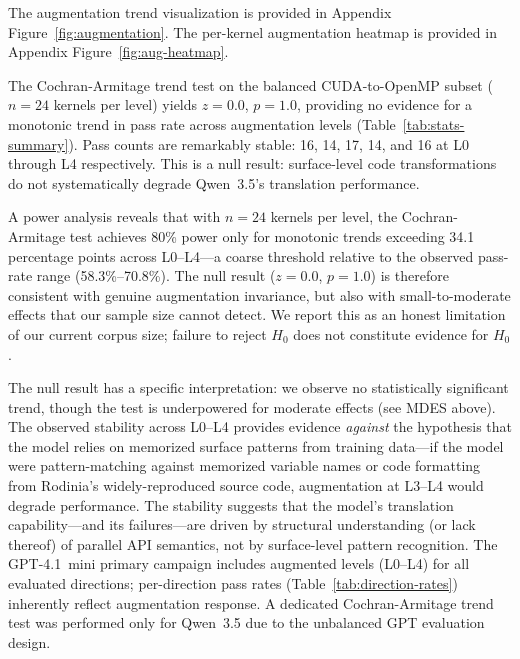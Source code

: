 \documentclass[conference]{IEEEtran}
\begin{document}
The augmentation trend visualization is provided in Appendix Figure~\ref{fig:augmentation}.
The per-kernel augmentation heatmap is provided in Appendix Figure~\ref{fig:aug-heatmap}.


The Cochran-Armitage trend test on the balanced CUDA-to-OpenMP subset ($n=24$ kernels per level) yields $z = 0.0$, $p = 1.0$, providing no evidence for a monotonic trend in pass rate across augmentation levels (Table~\ref{tab:stats-summary}). Pass counts are remarkably stable: 16, 14, 17, 14, and 16 at L0 through L4 respectively. This is a null result: surface-level code transformations do not systematically degrade Qwen~3.5's translation performance.

A power analysis reveals that with $n=24$ kernels per level,
the Cochran-Armitage test achieves 80\% power only for monotonic
trends exceeding 34.1 percentage points across L0--L4---a coarse
threshold relative to the observed pass-rate range
(58.3\%--70.8\%). The null result ($z = 0.0$, $p = 1.0$) is
therefore consistent with genuine augmentation invariance, but
also with small-to-moderate effects that our sample size cannot
detect. We report this as an honest limitation of our current
corpus size; failure to reject $H_0$ does not constitute evidence
for $H_0$.

The null result has a specific interpretation: we observe no statistically significant trend, though the test is underpowered for moderate effects (see MDES above). The observed stability across L0--L4 provides evidence \emph{against} the hypothesis that the model relies on memorized surface patterns from training data---if the model were pattern-matching against memorized variable names or code formatting from Rodinia's widely-reproduced source code, augmentation at L3--L4 would degrade performance. The stability suggests that the model's translation capability---and its failures---are driven by structural understanding (or lack thereof) of parallel API semantics, not by surface-level pattern recognition. The GPT-4.1~mini primary campaign includes augmented levels (L0--L4) for all evaluated directions; per-direction pass rates (Table~\ref{tab:direction-rates}) inherently reflect augmentation response. A dedicated Cochran-Armitage trend test was performed only for Qwen~3.5 due to the unbalanced GPT evaluation design. %
\end{document}
